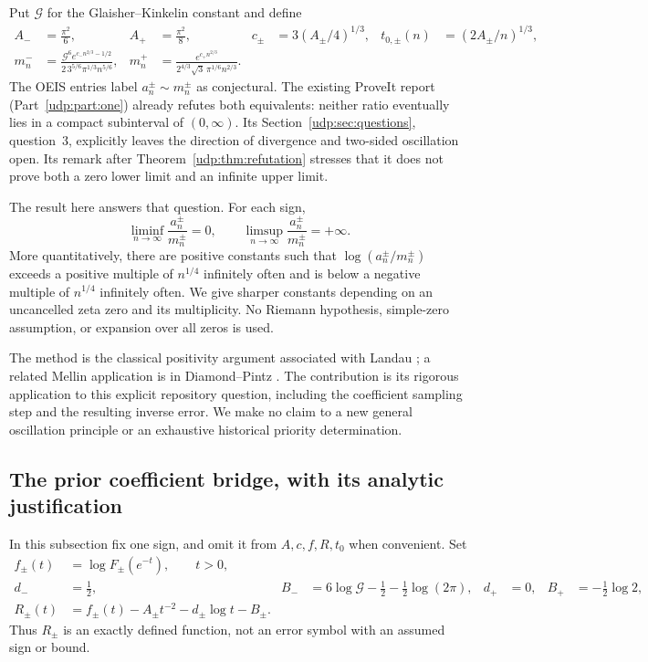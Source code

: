 \documentclass[11pt]{article}
\theoremstyle{remark}\newtheorem{remark}[theorem]{Remark}
\numberwithin{equation}{section}
\begin{document}
Put $\mathcal G$ for the Glaisher--Kinkelin constant and define
\begin{align}
 A_-&=\frac{\pi^2}{6},&
 A_+&=\frac{\pi^2}{8},&
 c_\pm&=3(A_\pm/4)^{1/3},&
 t_{0,\pm}(n)&=(2A_\pm/n)^{1/3},\label{udp:tw:eq:scales}\\
 m_n^-&=
 \frac{\mathcal G^6e^{c_-n^{2/3}-1/2}}
 {2\,3^{5/6}\pi^{1/3}n^{5/6}},&
 m_n^+&=
 \frac{e^{c_+n^{2/3}}}
 {2^{4/3}\sqrt3\,\pi^{1/6}n^{2/3}}.\label{udp:tw:eq:models}
\end{align}
The OEIS entries label $a_n^\pm\sim m_n^\pm$ as conjectural.
The existing ProveIt report (Part~\ref{udp:part:one}) already refutes both
equivalents: neither ratio eventually lies in a compact subinterval of
$(0,\infty)$. Its Section~\ref{udp:sec:questions}, question~3, explicitly leaves the direction
of divergence and two-sided oscillation open. Its remark after
Theorem~\ref{udp:thm:refutation} stresses that it does not prove both a zero lower limit and
an infinite upper limit.

The result here answers that question. For each sign,
\begin{equation}
 \liminf_{n\to\infty}\frac{a_n^\pm}{m_n^\pm}=0,
 \qquad
 \limsup_{n\to\infty}\frac{a_n^\pm}{m_n^\pm}=+\infty.
 \label{udp:tw:eq:ratio-oscillation}
\end{equation}
More quantitatively, there are positive constants such that
$\log(a_n^\pm/m_n^\pm)$ exceeds a positive multiple of $n^{1/4}$
infinitely often and is below a negative multiple of $n^{1/4}$
infinitely often. We give sharper constants depending on an uncancelled
zeta zero and its multiplicity. No Riemann hypothesis, simple-zero
assumption, or expansion over all zeros is used.

The method is the classical positivity argument associated with Landau
\cite{landau1905}; a related Mellin application is in
Diamond--Pintz \cite{diamondpintz2009}. The contribution is its rigorous
application to this explicit repository question, including the
coefficient sampling step and the resulting inverse error. We make no
claim to a new general oscillation principle or an exhaustive historical
priority determination.

\subsection{The prior coefficient bridge, with its analytic justification}

In this subsection fix one sign, and omit it from $A,c,f,R,t_0$ when
convenient. Set
\begin{align}
 f_\pm(t)&=\log F_\pm(e^{-t}),\qquad t>0,\nonumber\\
 d_-&=\tfrac12,&
 B_-&=6\log\mathcal G-\tfrac12-\tfrac12\log(2\pi),&
 d_+&=0,& B_+&=-\tfrac12\log2,\nonumber\\
 R_\pm(t)&=f_\pm(t)-A_\pm t^{-2}-d_\pm\log t-B_\pm.
 \label{udp:tw:eq:remainder}
\end{align}
Thus $R_\pm$ is an exactly defined function, not an error symbol with an
assumed sign or bound.
\end{document}
